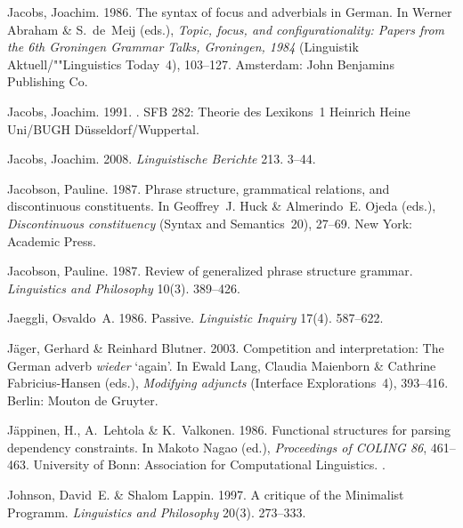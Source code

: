 \begin{thebibliography}{1420}
Jacobs, Joachim. 1986.
\newblock The syntax of focus and adverbials in {German}.
\newblock In Werner Abraham \& S.~de~Meij (eds.), \emph{Topic, focus, and
  configurationality: {Papers} from the {6th Groningen Grammar Talks,
  Groningen, 1984}} (Linguistik Aktuell/""Linguistics Today~4), 103--127.
  Amsterdam: John Benjamins Publishing Co.

Jacobs, Joachim. 1991.
.
\newblock SFB 282: Theorie des Lexikons~1 Heinrich Heine Uni/BUGH
  D{\"u}sseldorf/Wuppertal.

Jacobs, Joachim. 2008.
\newblock \emph{Linguistische Berichte} 213. 3--44.

Jacobson, Pauline. 1987{}.
\newblock Phrase structure, grammatical relations, and discontinuous
  constituents.
\newblock In Geoffrey~J. Huck \& Almerindo~E. Ojeda (eds.), \emph{Discontinuous
  constituency} (Syntax and Semantics~20), 27--69. New York: Academic Press.

Jacobson, Pauline. 1987{}.
\newblock Review of generalized phrase structure grammar.
\newblock \emph{Linguistics and Philosophy} 10(3). 389--426.

Jaeggli, Osvaldo~A. 1986.
\newblock Passive.
\newblock \emph{Linguistic Inquiry} 17(4). 587--622.

J{\"a}ger, Gerhard \& Reinhard Blutner. 2003.
\newblock Competition and interpretation: {The} {German} adverb \emph{wieder}
  `again'.
\newblock In Ewald Lang, Claudia Maienborn \& Cathrine Fabricius-Hansen (eds.),
  \emph{Modifying adjuncts} (Interface Explorations~4), 393--416. Berlin:
  Mouton de Gruyter.

J{\"a}ppinen, H., A.~Lehtola \& K.~Valkonen. 1986.
\newblock Functional structures for parsing dependency constraints.
\newblock In Makoto Nagao (ed.), \emph{Proceedings of {COLING} 86}, 461--463.
  University of Bonn: Association for Computational Linguistics.
\newblock {}.

Johnson, David~E. \& Shalom Lappin. 1997.
\newblock A critique of the {Minimalist Programm}.
\newblock \emph{Linguistics and Philosophy} 20(3). 273--333.


\end{thebibliography}
